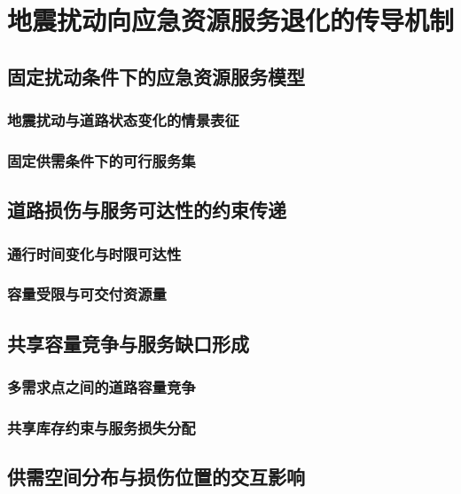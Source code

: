 \chapter{地震扰动向应急资源服务退化的传导机制}
\label{chap:degradation}

\section{固定扰动条件下的应急资源服务模型}
\subsection{地震扰动与道路状态变化的情景表征}
\subsection{固定供需条件下的可行服务集}

\ThesisBlank

\section{道路损伤与服务可达性的约束传递}
\subsection{通行时间变化与时限可达性}
\subsection{容量受限与可交付资源量}

\ThesisBlank

\section{共享容量竞争与服务缺口形成}
\subsection{多需求点之间的道路容量竞争}
\subsection{共享库存约束与服务损失分配}

\ThesisBlank

\section{供需空间分布与损伤位置的交互影响}
